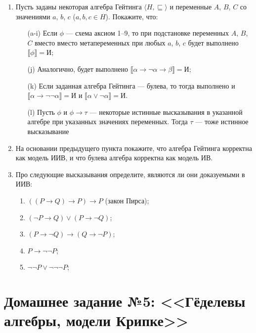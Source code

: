 \documentclass[10pt,a4paper,oneside]{article}
\begin{document}
\begin{enumerate}
\item Пусть заданы некоторая алгебра Гейтинга $\langle H, \sqsubseteq\rangle$
и переменные $A$, $B$, $C$ со значениями $a$, $b$, $c$ ($a,b,c \in H$). Покажите, что:
\begin{enumerate}
\item[(a-i)] Если $\phi$ --- схема аксиом 1--9, то при подстановке переменных $A$, $B$, $C$ вместо 
вместо метапеременных при любых $a$, $b$, $c$ будет выполнено $\llbracket\phi\rrbracket = \texttt{И}$;
\item[(j)] Аналогично, будет выполнено 
$\llbracket\alpha\rightarrow\neg\alpha\rightarrow\beta\rrbracket = \texttt{И}$;
\item[(k)] Если заданная алгебра Гейтинга --- булева, то тогда выполнено и
$\llbracket\alpha\rightarrow\neg\neg\alpha\rrbracket = \texttt{И}$ и 
$\llbracket\alpha\vee\neg\alpha\rrbracket = \texttt{И}$.
\item[(l)] Пусть $\phi$ и $\phi\rightarrow\tau$ --- некоторые истинные высказывания в указанной
алгебре при указанных значениях переменных. Тогда $\tau$ --- тоже истинное высказывание
\end{enumerate}

\item На основании предыдущего пункта покажите, что алгебра Гейтинга корректна как модель ИИВ,
и что булева алгебра корректна как модель ИВ.

\item Про следующие высказывания определите, являются ли они доказуемыми в ИИВ:
\begin{enumerate}
\item $((P\to Q)\to P)\to P$ (закон Пирса);
\item $(\neg P\to Q)\vee(P \to\neg Q)$;
\item $(P \to \neg Q) \rightarrow (Q \to \neg P)$;
\item $P \rightarrow \neg\neg P$;
\item $\neg\neg P \vee \neg\neg\neg P$;
\end{enumerate}

\end{enumerate}

\section*{Домашнее задание №5: <<Гёделевы алгебры, модели Крипке>>}
\end{document}
